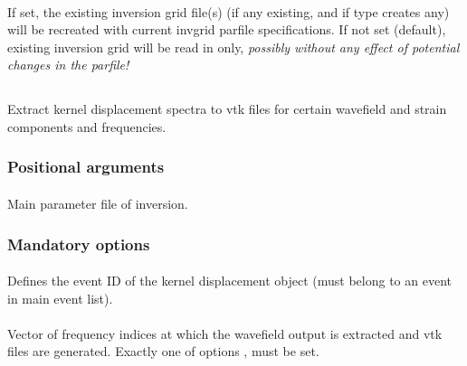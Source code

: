 \paragraph{}
If set, the existing inversion grid file(s) (if any existing, and if type creates any) will be recreated with 
current invgrid parfile specifications. If not set (default), existing inversion grid will be read in only, 
\emph{possibly without any effect of potential changes in the parfile!}
%
%
\subsection{} \label{programs_scripts,sec:bin_prog,sec:kdispl_2_vtk}
Extract kernel displacement spectra to vtk files for certain wavefield and strain components and frequencies.
\subsubsection{Positional arguments}
\paragraph{}
Main parameter file of inversion.
\subsubsection{Mandatory options}
\paragraph{ }
Defines the event ID of the kernel displacement object (must belong to an event in main event list).
\paragraph{}
Vector of  frequency indices at which the wavefield output is extracted and 
vtk files are generated. Exactly one of options  ,  must be set.
